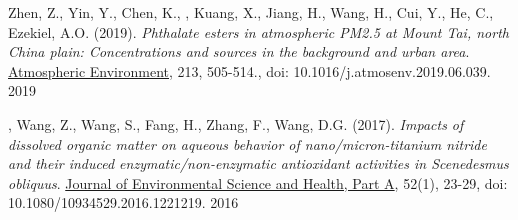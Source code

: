 \begin{cvpublications}
\publication
{Zhen, Z., Yin, Y., Chen, K., ,
Kuang, X., Jiang, H., Wang, H., Cui, Y., He, C., Ezekiel, A.O. (2019).
\emph{Phthalate esters in atmospheric PM2.5 at Mount Tai, north China plain:
Concentrations and sources in the background and urban area}.
\underline{Atmospheric Environment},
213, 505-514.,
doi: 10.1016/j.atmosenv.2019.06.039.} %
{2019} %

\publication
{, Wang, Z., Wang, S., Fang, H., Zhang, F., Wang, D.G. (2017).
\emph{Impacts of dissolved organic matter on aqueous behavior of nano/micron-titanium nitride and their induced enzymatic/non-enzymatic antioxidant activities in Scenedesmus obliquus}.
\underline{Journal of Environmental Science and Health, Part A},
52(1), 23-29,
doi: 10.1080/10934529.2016.1221219.} %
{2016} %

\end{cvpublications}
